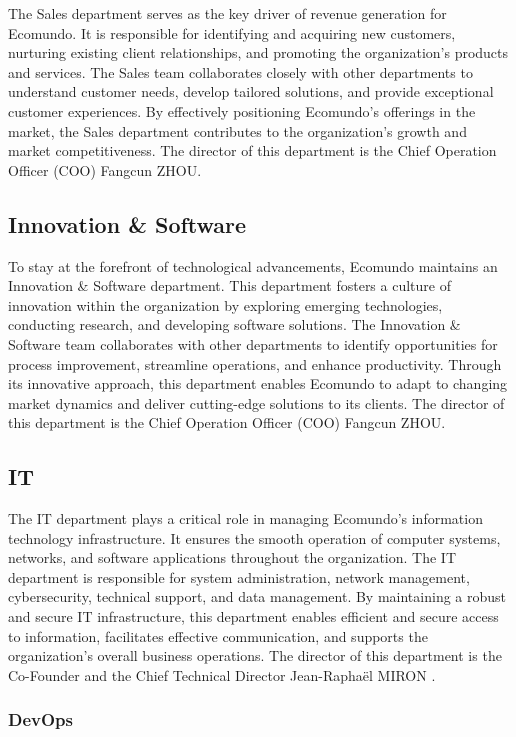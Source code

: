 \documentclass[a4paper,12pt,twoside]{report}
\begin{document}
The Sales department serves as the key driver of revenue generation for Ecomundo. It is responsible for identifying and acquiring new customers, nurturing existing client relationships, and promoting the organization's products and services. The Sales team collaborates closely with other departments to understand customer needs, develop tailored solutions, and provide exceptional customer experiences. By effectively positioning Ecomundo's offerings in the market, the Sales department contributes to the organization's growth and market competitiveness. The director of this department is the Chief Operation Officer (COO) Fangcun ZHOU.

\subsection{Innovation \& Software}

To stay at the forefront of technological advancements, Ecomundo maintains an Innovation \& Software department. This department fosters a culture of innovation within the organization by exploring emerging technologies, conducting research, and developing software solutions. The Innovation \& Software team collaborates with other departments to identify opportunities for process improvement, streamline operations, and enhance productivity. Through its innovative approach, this department enables Ecomundo to adapt to changing market dynamics and deliver cutting-edge solutions to its clients. The director of this department is the Chief Operation Officer (COO) Fangcun ZHOU.

\subsection{IT}

The IT department plays a critical role in managing Ecomundo's information technology infrastructure. It ensures the smooth operation of computer systems, networks, and software applications throughout the organization. The IT department is responsible for system administration, network management, cybersecurity, technical support, and data management. By maintaining a robust and secure IT infrastructure, this department enables efficient and secure access to information, facilitates effective communication, and supports the organization's overall business operations. The director of this department is the Co-Founder and the Chief Technical Director Jean-Raphaël MIRON .


\subsubsection{DevOps}
\end{document}
